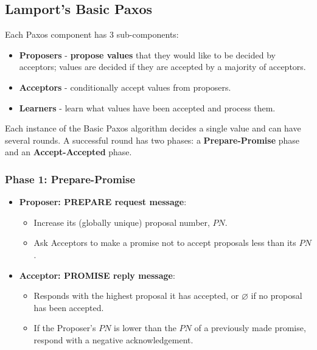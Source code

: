 \documentclass[11pt]{article}
\begin{document}
\subsection{Lamport's Basic Paxos}
Each Paxos component has 3 sub-components:
\begin{itemize}
  \item \textbf{Proposers} - \textbf{propose values} that they would like to be decided by acceptors; values are decided if they are accepted by a majority of acceptors.
  \item \textbf{Acceptors} - conditionally accept values from proposers.
  \item \textbf{Learners} - learn what values have been accepted and process them.
\end{itemize}
Each instance of the Basic Paxos algorithm decides a single value and can have several rounds.
A successful round has two phases: a \textbf{Prepare-Promise} phase and an \textbf{Accept-Accepted} phase.
\subsubsection{Phase 1: Prepare-Promise}
\begin{itemize}
  \item \textbf{Proposer: PREPARE request message}:
    \begin{itemize}
      \item Increase its (globally unique) proposal number, $PN$.
      \item Ask Acceptors to make a promise not to accept proposals less than its $PN$.
    \end{itemize}
  \item \textbf{Acceptor: PROMISE reply message}:
    \begin{itemize}
      \item Responds with the highest proposal it has accepted, or $\varnothing$ if no proposal has been accepted.
      \item If the Proposer's $PN$ is lower than the $PN$ of a previously made promise, respond with a negative acknowledgement.
    \end{itemize}
\end{itemize}
\end{document}
